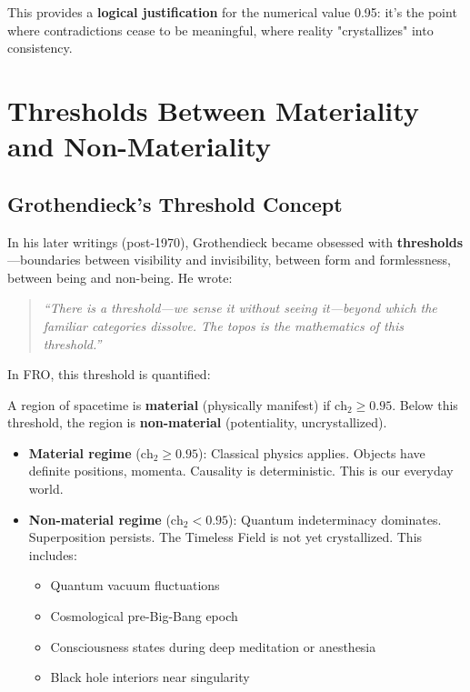 This provides a \textbf{logical justification} for the numerical value 0.95: it's the point where contradictions cease to be  meaningful, where reality "crystallizes" into consistency.

\section{Thresholds Between Materiality and Non-Materiality}

\subsection{Grothendieck's Threshold Concept}

In his later writings (post-1970), Grothendieck became obsessed with \textbf{thresholds}—boundaries between visibility and invisibility, between form and formlessness, between being and non-being. He wrote:

\begin{quote}
\textit{``There is a threshold—we sense it without seeing it—beyond which the familiar categories dissolve. The topos is the mathematics of this threshold.''}
\end{quote}

In FRO, this threshold is quantified:

\begin{definition}
\label{def:materiality_threshold}
A region of spacetime is \textbf{material} (physically manifest) if $\text{ch}_2 \geq 0.95$. Below this threshold, the region is \textbf{non-material} (potentiality, uncrystallized).
\end{definition}

\begin{itemize}
\item \textbf{Material regime} ($\text{ch}_2 \geq 0.95$): Classical physics applies. Objects have definite positions, momenta. Causality is deterministic. This is our everyday world.

\item \textbf{Non-material regime} ($\text{ch}_2 < 0.95$): Quantum indeterminacy dominates. Superposition persists. The Timeless Field is not yet crystallized. This includes:
\begin{itemize}
\item Quantum vacuum fluctuations
\item Cosmological pre-Big-Bang epoch
\item Consciousness states during deep meditation or anesthesia
\item Black hole interiors near singularity
\end{itemize}
\end{itemize}

